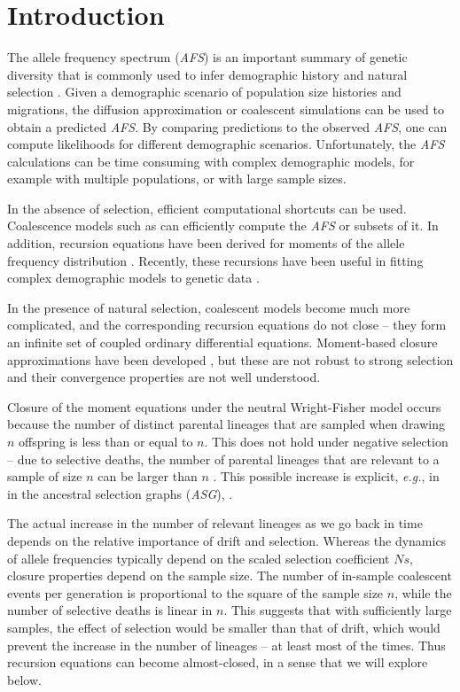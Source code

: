 \documentclass[review]{elsarticle}
\begin{document}
\section{Introduction}
\label{sec:introduciton}

The allele frequency spectrum (\textit{AFS}) is an important summary of genetic diversity that is
commonly used to infer demographic history and natural selection \citep{GutenkunstEtAl2009}. Given a
demographic scenario of population size histories and migrations, the diffusion approximation or
coalescent simulations can be used to obtain a predicted \textit{AFS}. By comparing predictions to
the observed \textit{AFS}, one can compute likelihoods for different demographic scenarios.
Unfortunately, the \textit{AFS} calculations can be time consuming with complex demographic models,
for example with multiple populations, or with large sample sizes.

In the absence of selection, efficient computational shortcuts can be used. Coalescence models such
as \citep{fastsimcoal2, KammEtAl2017} can efficiently compute the \textit{AFS} or subsets of it. In addition,
recursion equations have been derived for moments of the allele frequency distribution
\citep{KimuraCrow1964,Ewens1972,JouganousEtAl2017}. Recently, these recursions have been useful in
fitting complex demographic models to genetic data \citep{JouganousEtAl2017,KammEtAl2017}.
 
In the presence of natural selection, coalescent models become much more complicated, and the
corresponding recursion equations do not close \citep{DonnellyKurtz1999, JouganousEtAl2017} -- they
form an infinite set of coupled ordinary differential equations. Moment-based closure approximations
have been developed \citep{JouganousEtAl2017}, but these are not robust to strong selection and
their convergence properties are not well understood.

Closure of the moment equations under the neutral Wright-Fisher model occurs because the number of
distinct parental lineages that are sampled when drawing $n$ offspring is less than or equal to $n$.
This does not hold under negative selection -- due to selective deaths, the number of parental
lineages that are relevant to a sample of size $n$ can be larger than $n$ \citep{DonnellyKurtz1999a,
  JouganousEtAl2017}. This possible increase is explicit, \textit{e.g.}, in in the ancestral
selection graphs (\textit{ASG}), \citep{KroneNeuhauser1997}.

The actual increase in the number of relevant lineages as we go back in time depends on the relative
importance of drift and selection. Whereas the dynamics of allele frequencies typically depend on
the scaled selection coefficient $Ns$, closure properties depend on the sample size. The number of
in-sample coalescent events per generation is proportional to the square of the sample size $n$,
while the number of selective deaths is linear in $n$. This suggests that with sufficiently large
samples, the effect of selection would be smaller than that of drift, which would prevent the
increase in the number of lineages -- at least most of the times. Thus recursion equations can
become almost-closed, in a sense that we will explore below.
\end{document}

